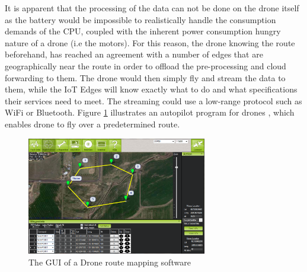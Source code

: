 It is apparent that the processing of the data can not be done on the drone itself as the battery would be impossible to realistically handle the consumption demands of the CPU, coupled with the inherent power consumption hungry nature of a drone (i.e the motors). For this reason, the drone knowing the route beforehand, has reached an agreement with a number of edges that are geographically near the route in order to offload the pre-processing and cloud forwarding to them. The drone would then simply fly and stream the data to them, while the IoT Edges will know exactly what to do and what specifications their services need to meet. The streaming could use a low-range protocol such as WiFi or Bluetooth. Figure \ref{fig:drone_map} illustrates an autopilot program for drones \cite{ardupilot}, which enables drone to fly over a predetermined route.

\begin{figure}[h]
    \centering
    \includegraphics[width=0.7\textwidth]{images/droneroute.png}
    \caption{The GUI of a Drone route mapping software\cite{ardupilot}}
    \label{fig:drone_map}
\end{figure}